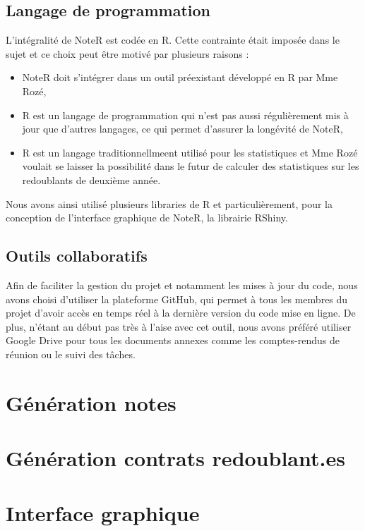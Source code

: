 \documentclass[a4paper,11pt]{article}
\begin{document}
\subsection{Langage de programmation }
    L'intégralité de NoteR est codée en R. Cette contrainte était imposée dans le sujet et ce choix peut être motivé par plusieurs raisons :
        \begin{itemize}
            \item NoteR doit s'intégrer dans un outil préexistant développé en R par Mme Rozé,
            \item R est un langage de programmation qui n'est pas aussi régulièrement mis à jour que d'autres langages, ce qui permet d'assurer la longévité de NoteR,
            \item  R est un langage traditionnellmeent utilisé pour les statistiques et Mme Rozé voulait se laisser la possibilité dans le futur de calculer des statistiques sur les redoublants de deuxième année.
        \end{itemize}
        Nous avons ainsi utilisé plusieurs libraries de R et particulièrement, pour la conception de l'interface graphique de NoteR, la librairie RShiny.
\subsection{Outils collaboratifs }
    Afin de faciliter la gestion du projet et notamment les mises à jour du code, nous avons choisi d'utiliser la plateforme GitHub, qui permet à tous les membres du projet d'avoir accès en temps réel à la dernière version du code mise en ligne. De plus, n'étant au début pas très à l'aise avec cet outil, nous avons préféré utiliser Google Drive pour tous les documents annexes comme les comptes-rendus de réunion ou le suivi des tâches.
  
\section{Génération notes }
  

\section{Génération contrats redoublant.es}
  

\section{Interface graphique }	
\end{document}
